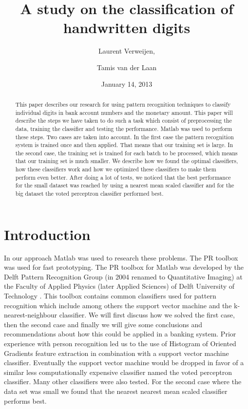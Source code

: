 \documentclass[%
        compressed,
        final,
        notitlepage,
        narroweqnarray,
        inline,
        twoside,
        ]{ieee}
\title{A study on the classification of handwritten digits}
\author{Laurent Verweijen, \and Tamis van der Laan}
\date{January 14, 2013}
\begin{document}
\maketitle

\begin{abstract}
This paper describes our research for using pattern recognition techniques to
classify individual digits in bank account numbers and the monetary amount. This
paper will describe the steps we have taken to do such a task which consist of
preprocessing the data, training the classifier and testing the performance.
Matlab was used to perform these steps. Two cases are taken into account. In the
first case the pattern recognition system is trained once and then applied.
That means that our training set is large. In the second case, the training set
is trained for each batch to be processed, which means that our training set is
much smaller. We describe how we found the optimal classifiers, how these
classifiers work and how we optimized these classifiers to make them perform
even better. After doing a lot of tests, we noticed that the best performance
for the small dataset was reached by using a nearest mean scaled classifier and
for the big dataset the voted perceptron classifier performed best. 
\end{abstract}

\section{Introduction}
In our approach Matlab was used to research these problems. The PR toolbox was
used for fast prototyping. The PR toolbox for Matlab was developed by the Delft
Pattern Recognition Group (in 2004 renamed to Quantitative Imaging) at the
Faculty of Applied Physics (later Applied Sciences) of Delft University of
Technology \cite{Ferdi}.
This toolbox contains common classifiers used for pattern recognition which
include among others the support vector machine and the k-nearest-neighbour classifier. We will first
discuss how we solved the first case, then the second case and finally we will
give some conclusions and recommendations about how this could be applied in a
banking system. Prior experience with person recognition \cite{Tamis} led us to
the use of Histogram of Oriented Gradients feature
extraction in combination with a support vector machine classifier. Eventually
the support vector machine would be dropped in favor of a similar less
computationally expensive classifier named the voted perceptron classifier. Many
other classifiers were also tested. For the second case where the data set was small we found that the nearest nearest mean scaled classifier performs best.
\end{document}
